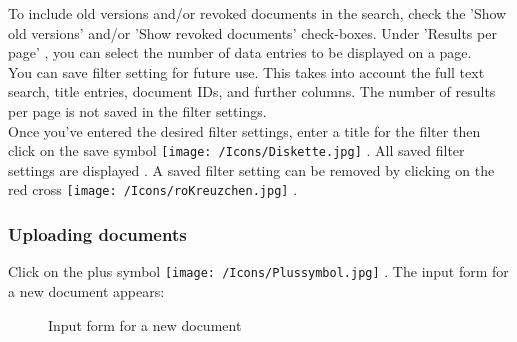 To include old versions and/or revoked documents in the search, check the 'Show old versions'  and/or 'Show revoked documents'  check-boxes. Under 'Results per page' , you can select the number of data entries to be displayed on a page.\\
You can save filter setting for future use. This takes into account the full text search, title entries, document IDs, and further columns. The number of results per page is not saved in the filter settings.\\
Once you've entered the desired filter settings, enter a title for the filter  then click on the save symbol \texttt{[image: /Icons/Diskette.jpg]} . All saved filter settings are displayed . A saved filter setting can be removed by clicking on the red cross \texttt{[image: /Icons/roKreuzchen.jpg]} .


\subsubsection{Uploading documents}
\label{bkm:Ref442863508}\label{bkm:Ref442787515}\label{bkm:Ref442778397}\label{bkm:Ref442770648}\label{bkm:Ref442769978}

\begin{figure}[H]
\end{figure}

Click on the plus symbol \texttt{[image: /Icons/Plussymbol.jpg]} . The input form for a new document appears:

\begin{figure}[H]
\caption{Input form for a new document}
\end{figure}

